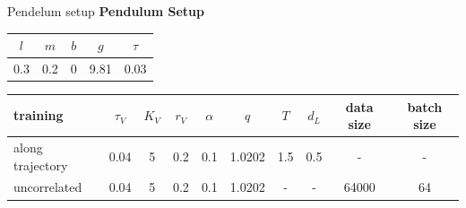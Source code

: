 \documentclass[11pt,aspectratio=169]{beamer}
\begin{document}
\begin{frame}{Pendelum setup}
        \textbf{Pendulum Setup}\vspace{-0.5cm}
    \begin{center}\begin{tabular}{  c | c | c | c |c  }
          $l$ & $m$ & $b$ & $g$ & $\tau$ \\
         \hline
           0.3 & 0.2 & 0 & 9.81 &0.03
        \end{tabular}\end{center}
    \begin{tabular}{ l | c | c | c | c |c | c |c |c| c  }
     training & $\tau_V$ & $K_V$& $r_V $  & $\alpha$ & $q$ &$T$ & $d_L$ & data size & batch size\\
     \hline
      along trajectory& 0.04 & 5 & 0.2 & 0.1 & 1.0202 & 1.5& 0.5& - & - \\
      uncorrelated& 0.04 & 5 & 0.2 & 0.1 & 1.0202 & - & - & 64000 & 64
    \end{tabular}
\end{frame}
\end{document}
